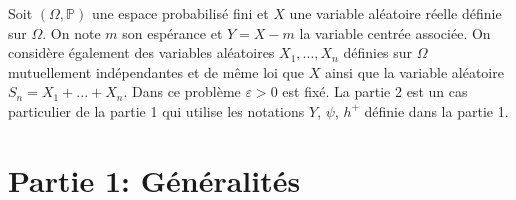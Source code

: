 Soit $(\Omega, \mathbb{P})$ une espace probabilisé fini et $X$ une variable aléatoire réelle définie sur $\Omega$. On note $m$ son espérance et $Y = X-m$ la variable centrée associée. On considère également des variables aléatoires $X_{1}, ..., X_{n}$ définies sur $\Omega$ mutuellement indépendantes et de même loi que $X$ ainsi que la variable aléatoire $S_{n} = X_{1}+...+X_{n}$. \newline
Dans ce problème $\varepsilon >0$ est fixé. La partie 2 est un cas particulier de la partie 1 qui utilise les notations $Y$, $\psi$, $h^+$ définie dans la partie 1.


\section*{Partie 1: Généralités}


